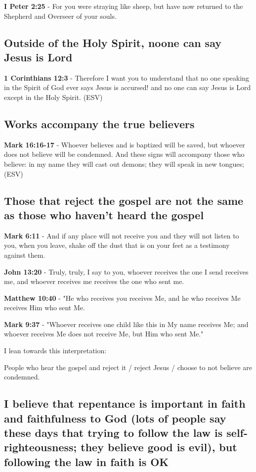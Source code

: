 \documentclass[11pt]{article}
\begin{document}
\textbf{I Peter 2:25} - For you were straying like sheep, but have now returned to the Shepherd and Overseer of your souls.

\subsection{Outside of the Holy Spirit, noone can say Jesus is Lord}
\label{sec:orgd07ba37}

\textbf{1 Corinthians 12:3} - Therefore I want you to understand that no one speaking in the Spirit of God ever says Jesus is accursed! and no one can say Jesus is Lord except in the Holy Spirit. (ESV)

\subsection{Works accompany the true believers}
\label{sec:orgdb66547}
\textbf{Mark 16:16-17} - Whoever believes and is baptized will be saved, but whoever does not believe will be condemned. And these signs will accompany those who believe: in my name they will cast out demons; they will speak in new tongues; (ESV)

\subsection{Those that reject the gospel are not the same as those who haven't heard the gospel}
\label{sec:orgac38ac3}
\textbf{Mark 6:11} - And if any place will not receive you and they will not listen to you, when you leave, shake off the dust that is on your feet as a testimony against them.

\textbf{John 13:20} - Truly, truly, I say to you, whoever receives the one I send receives me, and whoever receives me receives the one who sent me.

\textbf{Matthew 10:40} - "He who receives you receives Me, and he who receives Me receives Him who sent Me.

\textbf{Mark 9:37} - "Whoever receives one child like this in My name receives Me; and whoever receives Me does not receive Me, but Him who sent Me."

I lean towards this interpretation:

People who hear the gospel and reject it / reject Jesus / choose to not believe are condemned.

\subsection{I believe that repentance is important in faith and faithfulness to God (lots of people say these days that trying to follow the law is self-righteousness; they believe good is evil), but following the law in faith is OK}
\label{sec:orgfef1d69}
\end{document}
